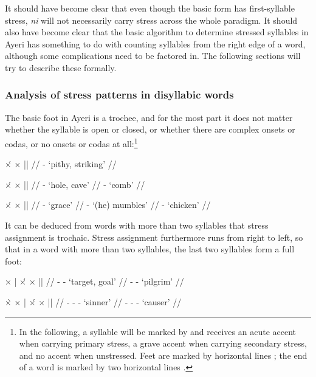 It should have become clear that even though the basic form  
has first-syllable stress, \textit{ni} will not necessarily carry stress across 
the whole paradigm.%
It should also have become clear that the basic algorithm to determine stressed 
syllables in Ayeri has something to do with counting syllables from the right 
edge of a word, although some complications need to be factored in. The 
following sections will try to describe these formally.

\subsubsection{Analysis of stress patterns in disyllabic words}

The basic foot in Ayeri is a trochee, and for the most part it does not matter 
whether the syllable is open or closed, or whether there are complex onsets or 
codas, or no onsets or codas at all:\footnote{In the following, a syllable will 
be marked by  and receives an acute accent  when carrying 
primary stress, a grave accent \orth{\`{}} when carrying secondary stress, and 
no accent when unstressed. Feet are marked by horizontal lines \orth{|}; the end 
of a word is marked by two horizontal lines \orth{||}.\label{fn:scansion}}

\pex[everygla=\upshape]
\a\begingl
	\gla ×́		{}	×	||	{} //
	\glb {}	-	 {}	{`pithy, striking'} //
\endgl

\a\begingl
	\gla ×́		{}	×		||	{} //
	\glb {}	-		{}	{`hole, cave'} //
	\glb {}	-			{}	{`comb'} //
\endgl

\a\begingl
	\gla ×́		{}	×		||	{} //
	\glb {}	-			{}	{`grace'} //
	\glb {}	-		{}	{`(he) mumbles'} //
	\glb {}	-			{}	{`chicken'} //
\endgl
\xe

It can be deduced from words with more than two syllables that stress 
assignment is trochaic. Stress assignment furthermore runs from right to left, 
so that in a word with more than two syllables, the last two syllables form a 
full foot:

\pex[everygla=\upshape]
\a\begingl
	\gla ×		|	×́		{}	×		|| 	{} //
	\glb {}	-			-		{}	{`target, goal'} //
	\glb {}	-			-			{}	{`pilgrim'} //
\endgl

\a\label{ex:4sylstress}\begingl
	\gla ×̀		{}	×		|	×́		{}	×		||	{} //
	\glb {}	-			-			-			{}	{`sinner'} //
	\glb {}	-			-			-			{}	{`causer'} //
\endgl
\xe

